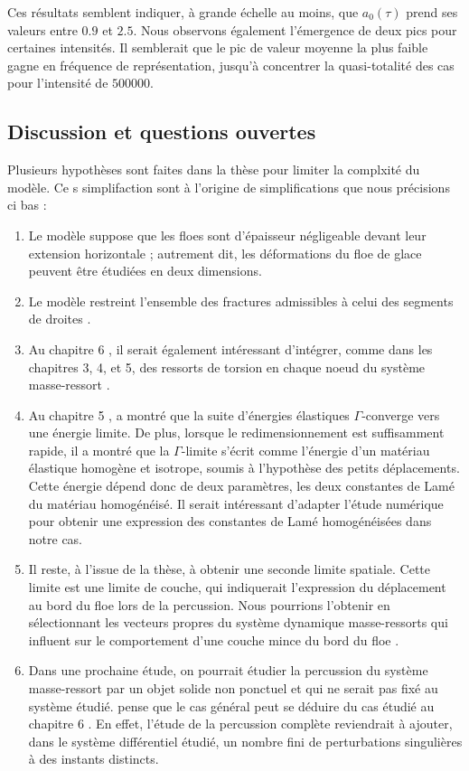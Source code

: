 \noindent Ces résultats semblent indiquer, à grande échelle au moins, que $a_0(\tau)$ prend ses valeurs entre $0.9$ et $2.5$. Nous observons également l’émergence de deux pics pour certaines intensités. Il semblerait que le pic de valeur moyenne la plus faible gagne en fréquence de représentation, jusqu’à concentrer la quasi-totalité des cas pour l’intensité de $500 000$.




\subsection{Discussion et questions ouvertes}

Plusieurs hypothèses sont faites dans la thèse pour limiter la complxité du modèle. Ce
s simplifaction sont à l'origine de simplifications que nous précisions ci bas :
\begin{enumerate}
    \item Le modèle suppose que les floes sont d’épaisseur négligeable devant leur extension horizontale ; autrement dit, les déformations du floe de glace peuvent être étudiées en deux dimensions.
    \item Le modèle restreint l’ensemble des fractures admissibles à celui des segments de droites \parencite[chp.2]{balasoiu2020halthesis}.
    \item Au chapitre 6 \parencite[p.187]{balasoiu2020halthesis}, il serait également intéressant d’intégrer, comme dans les chapitres 3, 4, et 5, des ressorts de torsion en chaque noeud du système masse-ressort \parencite[p.187]{balasoiu2020halthesis}.
    \item Au chapitre 5 \citeauthor[p.183]{balasoiu2020halthesis}, \citeauthor{balasoiu2020halthesis} a montré que la suite d’énergies élastiques $\Gamma$-converge vers une énergie limite. De plus, lorsque le redimensionnement est suffisamment rapide, il a montré que la $\Gamma$-limite s’écrit comme l’énergie d’un matériau élastique homogène et isotrope, soumis à l’hypothèse des petits déplacements. Cette énergie dépend donc de deux paramètres, les deux constantes de Lamé du matériau homogénéisé. Il serait intéressant d’adapter l’étude numérique \parencite{ostoja1995linear} pour obtenir une expression des constantes de Lamé homogénéisées dans notre cas.
    \item Il reste, à l’issue de la thèse, à obtenir une seconde limite spatiale. Cette limite est une limite de couche, qui indiquerait l’expression du déplacement au bord du floe lors de la percussion. Nous pourrions l’obtenir en sélectionnant les vecteurs propres du système dynamique masse-ressorts qui influent sur le comportement d’une couche mince du bord du floe \parencite[p.201]
    {balasoiu2020halthesis}.
    \item Dans une prochaine étude, on pourrait étudier la percussion du système masse-ressort par un objet solide non ponctuel et qui ne serait pas fixé au système étudié. \citeauthor{balasoiu2020halthesis} pense que le cas général peut se déduire du cas étudié au chapitre 6 \parencite[p.187]{balasoiu2020halthesis}. En effet, l’étude de la percussion complète reviendrait à ajouter, dans le système différentiel étudié, un nombre fini de perturbations singulières à des instants distincts. 
\end{enumerate}